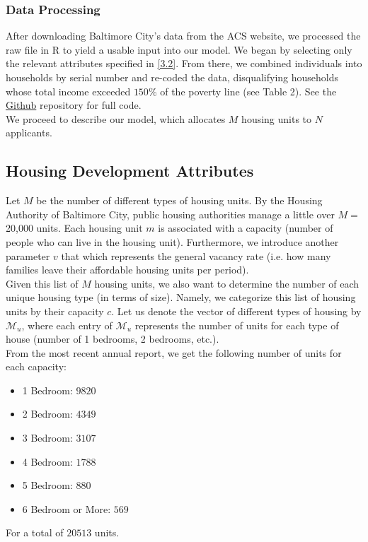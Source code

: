 \documentclass[11pt]{article}
\begin{document}
\subsubsection{Data Processing}
After downloading Baltimore City's data from the ACS website, we processed the raw file in R to yield a usable input into our model. We began by selecting only the relevant attributes specified in \autoref{3.2}. From there, we combined individuals into households by serial number and re-coded the data, disqualifying households whose total income exceeded $150\%$ of the poverty line (see Table 2). See the \href{https://github.com/atulpokh/cpsc464final/tree/main}{Github} repository for full code. \\
\newline
We proceed to describe our model, which allocates $M$ housing units to $N$ applicants. 
\subsection{Housing Development Attributes}
Let $M$ be the number of different types of housing units. By the Housing Authority of Baltimore City, public housing authorities manage a little over $M = $ 20,000 units. Each housing unit $m$ is associated with a capacity (number of people who can live in the housing unit). Furthermore, we introduce another parameter $v$ that which represents the general vacancy rate (i.e. how many families leave their affordable housing units per period). \\
\newline
Given this list of $M$ housing units, we also want to determine the number of each unique housing type (in terms of size). Namely, we categorize this list of housing units by their capacity $c$. Let us denote the vector of different types of housing by $\mathcal{M}_u$, where each entry of $\mathcal{M}_u$ represents the number of units for each type of house (number of 1 bedrooms, 2 bedrooms, etc.). \\
\newline
From the most recent annual report, we get the following number of units for each capacity:
\begin{itemize}
    \item 1 Bedroom: $9820$
    \item 2 Bedroom: $4349$
    \item 3 Bedroom: $3107$
    \item 4 Bedroom: $1788$
    \item 5 Bedroom: $880$
    \item 6 Bedroom or More: $569$ 
\end{itemize}
For a total of $20513$ units.
\end{document}
